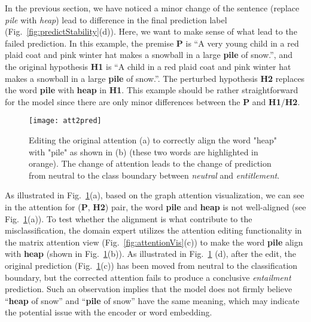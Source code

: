 In the previous section, we have noticed a minor change of the sentence (replace \emph{pile} with \emph{heap}) lead to difference in the final prediction label (Fig.~\ref{fig:predictStability}(d)). Here, we want to make sense of what lead to the failed prediction. In this example, the premise \textbf{P} is ``A very young child in a red plaid coat and pink winter hat makes a snowball in a large \textbf{pile} of snow.'', and the original hypothesis \textbf{H1} is ``A child in a red plaid coat and pink winter hat makes a snowball in a large \textbf{pile} of snow.''. The perturbed hypothesis \textbf{H2} replaces the word \textbf{pile} with \textbf{heap} in \textbf{H1}. This example should be rather straightforward for the model since there are only minor differences between the \textbf{P} and \textbf{H1}/\textbf{H2}.

\begin{figure}[htbp]
\centering
\vspace{-2mm}
 \texttt{[image: att2pred]}
 \caption{
Editing the original attention (a) to correctly align the word "heap" with "pile" as shown in (b) (these two words are highlighted in orange).
The change of attention leads to the change of prediction from neutral to the class boundary between \emph{neutral} and \emph{entitlement}.
%
}
\label{fig:att2pred}
\end{figure}

As illustrated in Fig.~\ref{fig:att2pred}(a), based on the graph attention visualization, we can see in the attention for (\textbf{P}, \textbf{H2}) pair, the word \textbf{pile} and \textbf{heap} is not well-aligned (see Fig.~\ref{fig:att2pred}(a)).
%
To test whether the alignment is what contribute to the misclassification, the domain expert utilizes the attention editing functionality in the matrix attention view (Fig.~\ref{fig:attentionVis}(c)) to make the word \textbf{pile} align with \textbf{heap} (shown in Fig.~\ref{fig:att2pred}(b)).
%
As illustrated in Fig.~\ref{fig:att2pred} (d), after the edit, the original prediction (Fig.~\ref{fig:att2pred}(c)) has been moved from neutral to the classification boundary, but the corrected attention fails to produce a conclusive \emph{entailment} prediction.
%
Such an observation implies that the model does not firmly believe ``\textbf{heap} of snow'' and ``\textbf{pile} of snow'' have the same meaning, which may indicate the potential issue with the encoder or word embedding.


